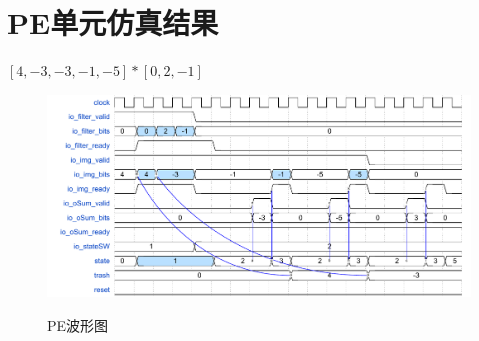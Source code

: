 \section{PE单元仿真结果}
$[4,-3,-3,-1,-5] * [0,2,-1]$
\begin{figure}[h]
    \centering
    \includegraphics[scale=0.7]{../pdf/pe_w.pdf}\\
    \caption{PE波形图}
\end{figure}

